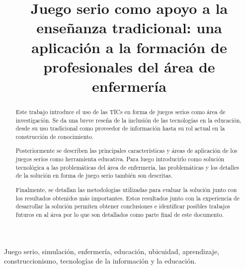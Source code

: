 \documentclass[conference]{util/IEEEtran}
\begin{document}



\title{Juego serio como apoyo a la enseñanza tradicional:  una
	aplicación a la formación de profesionales del área de enfermería}

\author{
\and
{}
}

\maketitle
\thispagestyle{plain}


\begin{abstract}

Este trabajo introduce el uso de las TICs en forma de juegos serios como 
área de investigación. Se da una breve reseña de la inclusión de las 
tecnologías en la educación, desde su uso tradicional como proveedor de información hasta su rol actual en la construcción de conocimiento. 

Posteriormente se describen las principales características y áreas de 
aplicación de los juegos serios como herramienta educativa. Para luego 
introducirlo como solución tecnológica a las problemáticas del área de 
enfermería, las problemáticas y los detalles de la solución en forma 
de juego serio también son descritas.

Finalmente, se detallan las metodologías utilizadas para evaluar la 
solución junto con los resultados obtenidos más importantes. Estos resultados 
junto con la experiencia de desarrollar la solución permiten
obtener conclusiones e identificar posibles trabajos futuros en al área por lo 
que son detallados como parte final de este documento.



\end{abstract}

\begin{IEEEkeywords}
    Juego serio, simulación, enfermería, educación, ubicuidad, aprendizaje, 
    construccionismo, tecnologías de la información y la educación. 
\end{IEEEkeywords}
\end{document}

